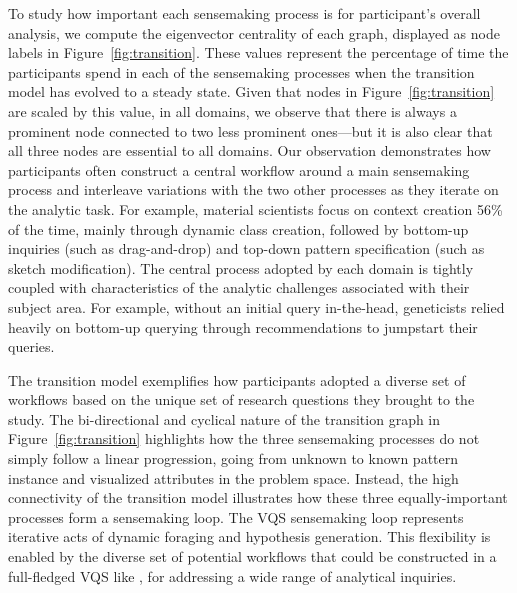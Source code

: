 \par To study how important each sensemaking process 
is for participant's overall analysis, 
we compute the eigenvector centrality of each graph, 
displayed as node labels in Figure~\ref{fig:transition}. 
These values represent the percentage of time the participants
spend in each of the sensemaking processes 
when the transition model has evolved to a steady state. 
Given that nodes in Figure~\ref{fig:transition} 
are scaled by this value, in all domains, 
we observe that there is always a prominent node 
connected to two less prominent ones---but it is also clear
that all three nodes are essential to all domains.
Our observation demonstrates how participants 
often construct a central workflow 
around a main sensemaking process 
and interleave variations with the two other processes 
as they iterate on the analytic task. 
For example, material scientists focus 
on context creation 56\% of the time, 
mainly through dynamic class creation, 
followed by bottom-up inquiries (such as drag-and-drop)
 and top-down pattern specification (such as sketch modification). 
The central process adopted by each domain 
is tightly coupled with characteristics 
of the analytic challenges associated with their subject area. 
For example, without an initial query in-the-head, 
geneticists relied heavily on bottom-up querying 
through recommendations to jumpstart their queries. 
\par The transition model exemplifies how participants 
adopted a diverse set of workflows 
based on the unique set of research questions they brought to the study. 
The bi-directional and cyclical nature 
of the transition graph in Figure~\ref{fig:transition} highlights how the three sensemaking processes do not simply follow a linear progression, going from unknown to known pattern instance and visualized attributes in the problem space. Instead, the high connectivity of the transition model illustrates how these three equally-important processes form a sensemaking loop. The VQS sensemaking loop represents iterative acts of dynamic foraging and hypothesis generation. This flexibility is enabled by the diverse set of potential workflows that could be constructed in a full-fledged VQS like \zvpp, for addressing a wide range of analytical inquiries.%
